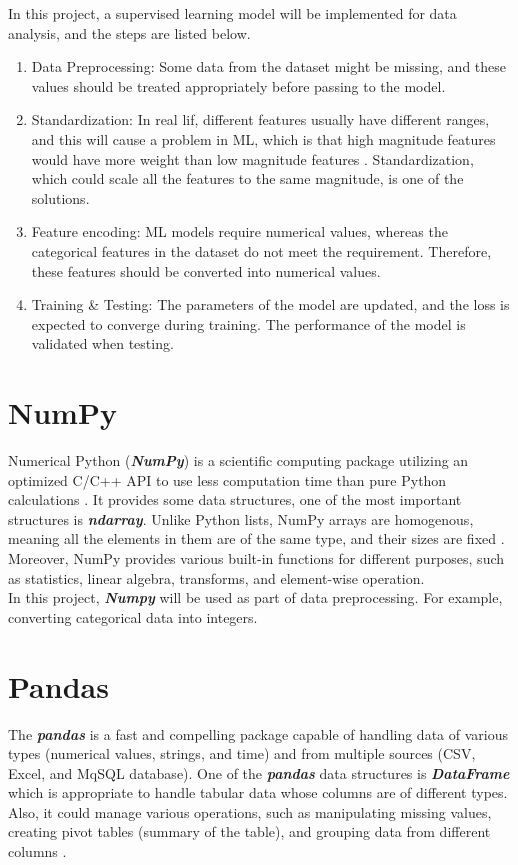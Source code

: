 \documentclass[12pt,twoside]{report}
\begin{document}
In this project, a supervised learning model will be implemented for data analysis, and the steps are listed below.
\begin{enumerate}
	\item Data Preprocessing: Some data from the dataset might be missing, and these values should be treated appropriately before passing to the model. 
	\item Standardization: In real lif, different features usually have different ranges, and this will cause a problem in ML, which is that high magnitude features would have more weight than low magnitude features \citep{RN4}. Standardization, which could scale all the features to the same magnitude, is one of the solutions.
	\item Feature encoding: ML models require numerical values, whereas the categorical features in the dataset do not meet the requirement. Therefore, these features should be converted into numerical values. 
	\item Training \& Testing: The parameters of the model are updated, and the loss is expected to converge during training. The performance of the model is validated when testing.
\end{enumerate}

\section{NumPy}
Numerical Python (\textit{\textbf{NumPy}}) is a scientific computing package utilizing an optimized C/C++ API to use less computation time than pure Python calculations \citep{RN6}. It provides some data structures, one of the most important structures is \textbf{\emph{ndarray}}. Unlike Python lists, NumPy arrays are homogenous, meaning all the elements in them are of the same type, and their sizes are fixed \citep{RN4}.  Moreover, NumPy provides various built-in functions for different purposes, such as statistics, linear algebra,  transforms, and element-wise operation. 
\\

In this project, \textit{\textbf{Numpy}} will be used as part of data preprocessing. For example, converting categorical data into integers.

\section{Pandas}
The \textbf{\textit{pandas}} is a fast and compelling package capable of handling data of various types (numerical values, strings, and time) and from multiple sources (CSV, Excel, and MqSQL database). One of the \textbf{\textit{pandas}} data structures is \textbf{\textit{DataFrame}} which is appropriate to handle tabular data whose columns are of different types. Also, it could manage various operations, such as manipulating missing values, creating pivot tables (summary of the table), and grouping data from different columns \citep{RN4}. 
\\
\end{document}
